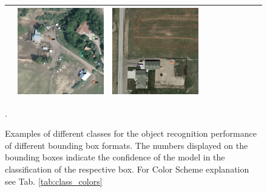 \begin{figure}[h!]
\begin{tabularx}{\textwidth}{c|*{9}{X}}
    & \includegraphics[trim={740pt 420pt 180pt 510pt},clip,width=\linewidth]{images/015Results/01abb_vs_obb/comp_images/aab_old/523.png}
    & \includegraphics[trim={300pt 355pt 610pt 570pt},clip,width=\linewidth]{images/015Results/01abb_vs_obb/comp_images/aab_old/198.png} \\ \hline
\end{tabularx}
\caption[aab and obb: Examples of different classes for the object recognition performance]{Examples of different classes for the object recognition performance of different bounding box formats. The numbers displayed on the bounding boxes indicate the confidence of the model in the classification of the respective box. For Color Scheme explanation see Tab. \ref{tab:class_colors}}.
\label{fig:aab_obb_example_pics}
\end{figure}